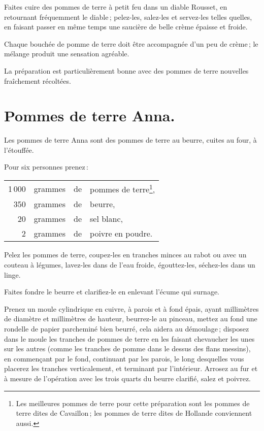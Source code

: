 Faites cuire des pommes de terre à petit feu dans un diable Rousset, en
retournant fréquemment le diable ; pelez-les, salez-les et servez-les telles
quelles, en faisant passer en même temps une saucière de belle crème épaisse et
froide.

Chaque bouchée de pomme de terre doit être accompagnée d'un peu de crème ; le
mélange produit une sensation agréable.

La préparation est particulièrement bonne avec des pommes de terre nouvelles
fraîchement récoltées.

\section*{\centering Pommes de terre Anna.}
{}

Les pommes de terre Anna sont des pommes de terre au beurre, cuites au four,
à l'étouffée.

\medskip

Pour six personnes prenez :

\footnotesize
\begin{longtable}{rrrp{16em}}
  1 000 & grammes & de & pommes de terre\footnote{Les meilleures pommes de terre
                                        pour cette préparation sont les pommes de terre
                                        dites de Cavaillon ; les pommes de terre dites de
                                        Hollande conviennent aussi.},                                     \\
    350 & grammes & de & beurre,                                                                          \\
     20 & grammes & de & sel blanc,                                                                       \\
      2 & grammes & de & poivre en poudre.                                                                \\
\end{longtable}
\normalsize

Pelez les pommes de terre, coupez-les en tranches minces au rabot ou avec un
couteau à légumes, lavez-les dans de l'eau froide, égouttez-les, séchez-les
dans un linge.

Faites fondre le beurre et clarifiez-le en enlevant l'écume qui surnage.

Prenez un moule cylindrique en cuivre, à parois et à fond épais, ayant
{\mmm} millimètres de diamètre et {\mmm} millimètres de hauteur,
beurrez-le au pinceau, mettez au fond une rondelle de papier parcheminé bien
beurré, cela aidera au démoulage ; disposez dans le moule les tranches de
pommes de terre en les faisant chevaucher les unes sur les autres (comme les
tranches de pomme dans le dessus des flans messins), en commençant par le fond,
continuant par les parois, le long desquelles vous placerez les tranches
verticalement, et terminant par l'intérieur. Arrosez au fur et à mesure de
l'opération avec les trois quarts du beurre clarifié, salez et poivrez.

